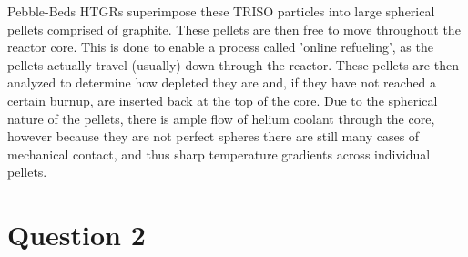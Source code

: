 \documentclass{article}
\begin{document}
Pebble-Beds HTGRs superimpose these TRISO particles into large spherical pellets comprised of graphite. These pellets are then free to move throughout the reactor core. This is done to enable a process called 'online refueling', as the pellets actually travel (usually) down through the reactor. These pellets are then analyzed to determine how depleted they are and, if they have not reached a certain burnup, are inserted back at the top of the core. Due to the spherical nature of the pellets, there is ample flow of helium coolant through the core, however because they are not perfect spheres there are still many cases of mechanical contact, and thus sharp temperature gradients across individual pellets. 

\newpage
\section*{Question 2}
\end{document}
